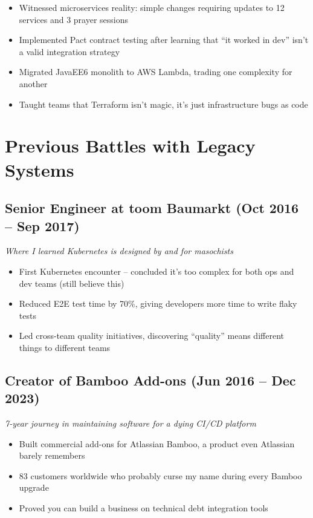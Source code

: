 \documentclass[10pt,a4paper]{article}
\begin{document}
\begin{itemize}[leftmargin=*, topsep=0pt, itemsep=1pt]
\item Witnessed microservices reality: simple changes requiring updates to 12 services and 3 prayer sessions
\item Implemented Pact contract testing after learning that ``it worked in dev'' isn't a valid integration strategy
\item Migrated JavaEE6 monolith to AWS Lambda, trading one complexity for another
\item Taught teams that Terraform isn't magic, it's just infrastructure bugs as code
\end{itemize}

\vfill

\newpage

\section*{Previous Battles with Legacy Systems}

\subsection*{Senior Engineer at toom Baumarkt (Oct 2016 -- Sep 2017)}
\textit{Where I learned Kubernetes is designed by and for masochists}

\begin{itemize}[leftmargin=*, topsep=0pt, itemsep=1pt]
\item First Kubernetes encounter -- concluded it's too complex for both ops and dev teams (still believe this)
\item Reduced E2E test time by 70\%, giving developers more time to write flaky tests
\item Led cross-team quality initiatives, discovering ``quality'' means different things to different teams
\end{itemize}

\subsection*{Creator of Bamboo Add-ons (Jun 2016 -- Dec 2023)}
\textit{7-year journey in maintaining software for a dying CI/CD platform}

\begin{itemize}[leftmargin=*, topsep=0pt, itemsep=1pt]
\item Built commercial add-ons for Atlassian Bamboo, a product even Atlassian barely remembers
\item 83 customers worldwide who probably curse my name during every Bamboo upgrade
\item Proved you can build a business on technical debt integration tools
\end{itemize}
\end{document}
